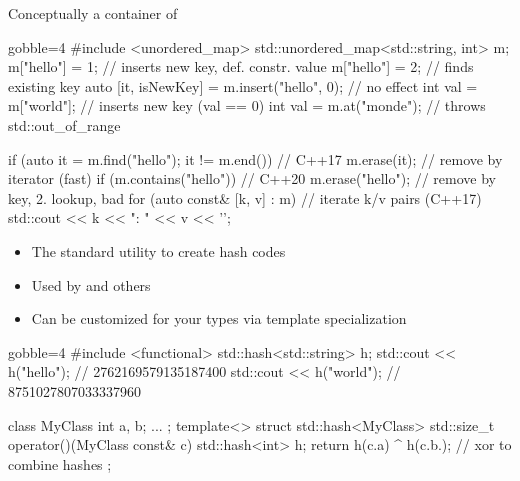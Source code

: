 \begin{frame}[fragile]
    \begin{block}{}
        Conceptually a container of 
    \end{block}
    \begin{cppcode*}{gobble=4}
        #include <unordered_map>
        std::unordered_map<std::string, int> m;
        m["hello"] = 1;  // inserts new key, def. constr. value
        m["hello"] = 2;  // finds existing key
        auto [it, isNewKey] = m.insert({"hello", 0}); // no effect
        int val = m["world"];    // inserts new key (val == 0)
        int val = m.at("monde"); // throws std::out_of_range

        if (auto it = m.find("hello"); it != m.end()) // C++17
            m.erase(it);      // remove by iterator (fast)
        if (m.contains("hello")) // C++20
            m.erase("hello"); // remove by key, 2. lookup, bad
        for (auto const& [k, v] : m) // iterate k/v pairs (C++17)
            std::cout << k << ": " << v << '\n';
    \end{cppcode*}
\end{frame}

\begin{frame}[fragile]
    \begin{block}{}
        \begin{itemize}
            \item The standard utility to create hash codes
            \item Used by  and others
            \item Can be customized for your types via template specialization
        \end{itemize}
    \end{block}
    \begin{cppcode*}{gobble=4}
        #include <functional>
        std::hash<std::string> h;
        std::cout << h("hello"); // 2762169579135187400
        std::cout << h("world"); // 8751027807033337960

        class MyClass { int a, b; ... };
        template<> struct std::hash<MyClass> {
          std::size_t operator()(MyClass const& c) {
            std::hash<int> h;
            return h(c.a) ^ h(c.b.); // xor to combine hashes
          }
        };
    \end{cppcode*}
\end{frame}

